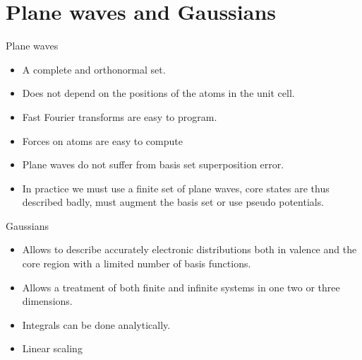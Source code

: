\documentclass[12pt,a4paper,english]{beamer}
\begin{document}
\section{Plane waves and Gaussians}
\begin{frame}
  Plane waves
  \begin{itemize}
	\item A complete and orthonormal set.
	\item Does not depend on the positions of the atoms in the unit cell.
	\item Fast Fourier transforms are easy to program.
	\item Forces on atoms are easy to compute
	\item Plane waves do not suffer from basis set superposition error.
	\item In practice we must use a finite set of plane waves, core states are thus described badly, must augment the basis set or use pseudo potentials.
  \end{itemize}
\end{frame}
\begin{frame}
  Gaussians
  \begin{itemize}
	\item Allows to describe accurately electronic distributions both in valence and the core region with a limited number of basis functions.
	\item Allows a treatment of both finite and infinite systems in one two or three dimensions.
	\item Integrals can be done analytically.
	\item Linear scaling
  \end{itemize}
\end{frame}
\end{document}

